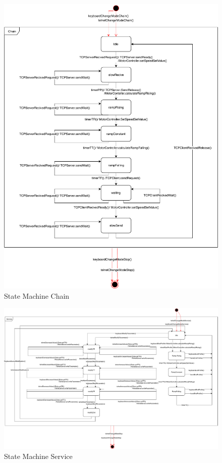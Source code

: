 \documentclass[a4paper,12pt,twoside]{scrreprt}
\begin{document}
\begin{figure}[H]
	\centering
	\includegraphics[width=\textwidth,height=\textheight,keepaspectratio]{stateDiagram/StateMachineChain.pdf}
	\caption[State Machine Chain]{State Machine Chain}
	\label{fig:StateMachineChain}
\end{figure}


\begin{figure}[H]
	\centering
	\includegraphics[width=\textwidth,height=\textheight,keepaspectratio]{stateDiagram/StateMachineService.pdf}
	\caption[State Machine Service]{State Machine Service}
	\label{fig:StateMachineService}
\end{figure}
\end{document}
